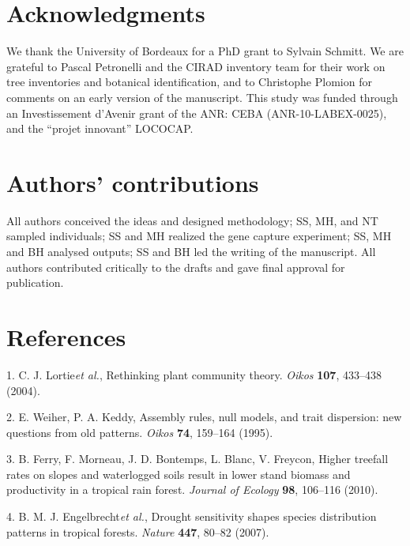 \documentclass[
]{article}
\begin{document}
\hypertarget{acknowledgments}{%
\section{Acknowledgments}\label{acknowledgments}}

We thank the University of Bordeaux for a PhD grant to Sylvain Schmitt.
We are grateful to Pascal Petronelli and the CIRAD inventory team for their work on tree inventories and botanical identification,
and to Christophe Plomion for comments on an early version of the manuscript.
This study was funded through an Investissement d'Avenir grant of the ANR: CEBA (ANR-10-LABEX-0025), and the ``projet innovant'' LOCOCAP.

\hypertarget{authors-contributions}{%
\section{Authors' contributions}\label{authors-contributions}}

All authors conceived the ideas and designed methodology;
SS, MH, and NT sampled individuals;
SS and MH realized the gene capture experiment;
SS, MH and BH analysed outputs;
SS and BH led the writing of the manuscript.
All authors contributed critically to the drafts and gave final approval for publication.

\hypertarget{references}{%
\section{References}\label{references}}

\hypertarget{refs}{}
\leavevmode\hypertarget{ref-Lortie2004a}{}%
1. C. J. Lortie\emph{et al.}, Rethinking plant community theory. \emph{Oikos} \textbf{107}, 433--438 (2004).

\leavevmode\hypertarget{ref-weiher_assembly_1995}{}%
2. E. Weiher, P. A. Keddy, Assembly rules, null models, and trait dispersion: new questions from old patterns. \emph{Oikos} \textbf{74}, 159--164 (1995).

\leavevmode\hypertarget{ref-Ferry2010}{}%
3. B. Ferry, F. Morneau, J. D. Bontemps, L. Blanc, V. Freycon, Higher treefall rates on slopes and waterlogged soils result in lower stand biomass and productivity in a tropical rain forest. \emph{Journal of Ecology} \textbf{98}, 106--116 (2010).

\leavevmode\hypertarget{ref-Engelbrecht2007}{}%
4. B. M. J. Engelbrecht\emph{et al.}, Drought sensitivity shapes species distribution patterns in tropical forests. \emph{Nature} \textbf{447}, 80--82 (2007).
\end{document}
